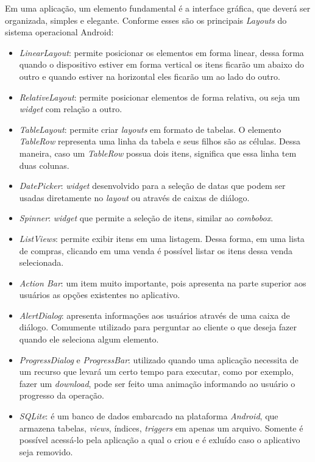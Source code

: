 	\par Em uma aplicação, um elemento fundamental é a interface gráfica, que
deverá ser organizada, simples e elegante. Conforme 
esses são os principais \textit{Layouts} do sistema operacional Android:
	\begin{itemize}
	
	 \item \textit{LinearLayout}: permite posicionar os elementos em forma
	 linear, dessa forma quando o dispositivo estiver em forma vertical os itens
	 ficarão um abaixo do outro e quando estiver na horizontal eles
	 ficarão um ao lado do outro.
	
	  \item \textit{RelativeLayout}: permite posicionar elementos de forma
	  relativa, ou seja um \textit{widget} com relação a outro.
	
	  \item \textit{TableLayout}: permite criar \textit{layouts} em formato de
	  tabelas. O elemento \textit{TableRow} representa uma linha da tabela e seus
	  filhos são as células.  Dessa maneira, caso um \textit{TableRow} possua dois
	  itens, significa que essa linha tem duas colunas.
	
	  \item \textit{DatePicker}: \textit{widget} desenvolvido para a seleção de
	  datas que podem ser usadas diretamente no \textit{layout} ou através de
	  caixas de diálogo.

	  \item \textit{Spinner}: \textit{widget} que permite a seleção de itens,
	  similar ao \textit{combobox}.
	
	  \item \textit{ListViews}: permite exibir itens em uma listagem. Dessa
	  forma, em uma lista de compras, clicando em uma venda é possível listar os
	  itens dessa venda selecionada.
	
	  \item \textit{Action Bar}: um item muito importante, pois apresenta na parte
	  superior aos usuários as opções existentes no aplicativo.
	
	  \item \textit{AlertDialog}: apresenta informações aos usuários através de
	  uma caixa de diálogo. Comumente utilizado para perguntar ao cliente o que
	  deseja fazer quando ele seleciona algum elemento.
	
	  \item \textit{ProgressDialog} e \textit{ProgressBar}: utilizado quando uma
	  aplicação necessita de um recurso que levará um certo tempo para executar,
	  como por exemplo, fazer um \textit{download}, pode ser feito uma animação
	  informando ao usuário o progresso da operação.
	  
	  \item \textit{SQLite}: é um banco de dados embarcado na plataforma
	  \textit{Android}, que armazena tabelas, \textit{views}, índices,
	  \textit{triggers} em apenas um arquivo. Somente é possível
	  acessá-lo pela aplicação a qual o criou e é exluído caso o aplicativo seja
	  removido.

	\end{itemize}
	
